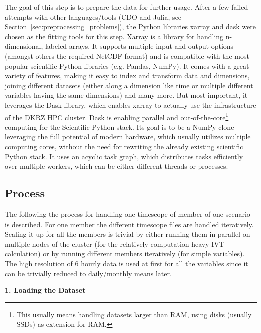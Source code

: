 The goal of this step is to prepare the data for further usage. 
After a few failed attempts with other languages/tools (CDO and Julia, see Section~\ref{sec:preprocessing_problems}), the Python libraries xarray \cite{hoyer_xarray_2017} and dask \cite{rocklin2015dask} were chosen as the fitting tools for this step.
Xarray is a library for handling n-dimensional, labeled arrays. It supports multiple input and output options (amongst others the required NetCDF format) and is compatible with the most popular scientific Python libraries (e.g. Pandas, NumPy). 
It comes with a great variety of features, making it easy to index and transform data and dimensions, joining different datasets (either along a dimension like time or multiple different variables having the same dimensions) and many more. 
But most important, it leverages the Dask library, which enables xarray to actually use the infrastructure of the DKRZ HPC cluster. 
Dask is enabling parallel and out-of-the-core\footnote{This usually means handling datasets larger than RAM, using disks (usually SSDs) as extension for RAM.} computing for the Scientific Python stack. 
Its goal is to be a NumPy clone leveraging the full potential of modern hardware, which usually utilizes multiple computing cores, without the need for rewriting the already existing scientific Python stack. 
It uses an acyclic task graph, which distributes tasks efficiently over multiple workers, which can be either different threads or processes. \cite{rocklin2015dask}


\subsection{Process}

The following the process for handling one timescope of member of one scenario is described. For one member the different timescope files are handled iteratively. 
Scaling it up for all the members is trivial by either running them in parallel on multiple nodes of the cluster (for the relatively computation-heavy IVT calculation) or by running different members iteratively (for simple variables). 
The high resolution of 6 hourly data is used at first for all the variables since it can be trivially reduced to daily/monthly means later. 

\textbf{1. Loading the Dataset}

